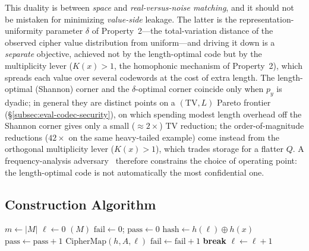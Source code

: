 \documentclass[11pt]{article}
\theoremstyle{definition}
\theoremstyle{plain}
\theoremstyle{remark}
\begin{document}
This duality is between \emph{space} and \emph{real-versus-noise
matching}, and it should not be mistaken for minimizing \emph{value-side}
leakage.  The latter is the representation-uniformity parameter $\delta$
of Property~2---the total-variation distance of the observed cipher value
distribution from uniform---and driving it down is a \emph{separate}
objective, achieved not by the length-optimal code but by the multiplicity
lever ($K(x) > 1$, the homophonic mechanism of Property~2), which spreads
each value over several codewords at the cost of extra length.  The
length-optimal (Shannon) corner and the $\delta$-optimal corner coincide
only when $p_y$ is dyadic; in general they are distinct points on a
$(\mathrm{TV}, L)$ Pareto frontier (\S\ref{subsec:eval-codec-security}),
on which spending modest length overhead off the Shannon corner gives
only a small ($\approx 2\times$) TV reduction; the order-of-magnitude
reductions ($42\times$ on the same heavy-tailed example) come instead
from the orthogonal multiplicity lever ($K(x) > 1$), which trades
storage for a flatter $Q$.  A frequency-analysis
adversary~\cite{naveed2015inference} therefore constrains the choice of
operating point: the length-optimal code is not automatically the most
confidential one.

\subsection{Construction Algorithm}
\label{subsec:construction-alg}

\begin{algorithm}
\caption{Batch Cipher Map Construction}
\label{alg:singular-hash}
\begin{algorithmic}[1]
    \State $m \gets |M|$
    \State $\ell \gets 0$
        \State {}$(M)$
        \State $\text{fail} \gets 0$;\; $\text{pass} \gets 0$
            \State $\text{hash} \gets h(\ell) \oplus h(x)$
                \State $\text{pass} \gets \text{pass} + 1$
                    \State \Return $\text{CipherMap}(h, A, \ell)$
                \EndIf
            \Else
                \State $\text{fail} \gets \text{fail} + 1$
                    \State \textbf{break}
                \EndIf
            \EndIf
        \EndFor
        \State $\ell \gets \ell + 1$
    \EndWhile
\EndFunction
\end{algorithmic}
\end{algorithm}
\end{document}
